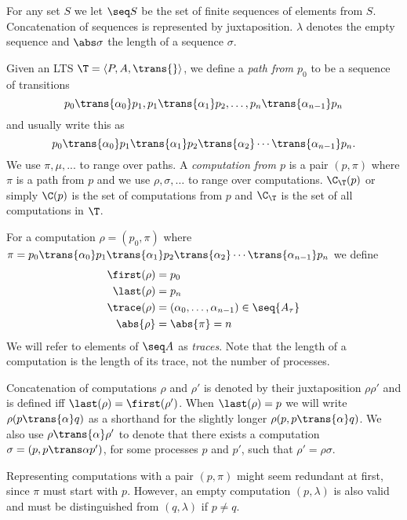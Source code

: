 \begin{definition}
    For any set $S$ we let $\seq S$ be the set of finite sequences of elements
    from $S$. Concatenation of sequences is represented by juxtaposition.
    $\lambda$ denotes the empty sequence and $\abs\sigma$ the length of a
    sequence $\sigma$.

    Given an LTS $\T = \langle P,A,\trans{} \rangle$, we define a
    \emph{path from $p_0$} to be a sequence of transitions
    \[
        p_0\trans{\alpha_0}p_1,
        p_1\trans{\alpha_1}p_2, \dots ,
        p_n\trans{\alpha_{n-1}}p_n
    \]
    and usually write this as
    \[
        p_0 \trans{\alpha_0} p_1
            \trans{\alpha_1} p_2
            \trans{\alpha_2} \cdots
            \trans{\alpha_{n-1}}p_n.
    \]
    We use $\pi,\mu,...$ to range over paths.
    A \emph{computation from $p$} is a pair $(p,\pi)$ where $\pi$ is a path
    from $p$ and
    we use $\rho,\sigma,\dots$ to
    range over computations.
    $\C_\T(p)$ or simply $\C(p)$ is the set of computations from $p$ and
    $\C_\T$ is the set of all computations in $\T$.

    For a computation $\rho = (p_0,\pi)$
    where $\pi = p_0 \trans{\alpha_0} p_1 \trans{\alpha_1} p_2 \trans{\alpha_2}
    \cdots \trans{\alpha_{n-1}}p_n$ we define
    \begin{align*}
        \first(\rho) &= p_0 \\
        \last(\rho) &= p_n \\
        \trace(\rho) &= (\alpha_0,\dots,\alpha_{n-1}) \in \seq{A_\tau} \\
        \abs{\rho} &= \abs{\pi} = n
    \end{align*}
    We will refer to  elements of $\seq A$
    as \emph{traces}. Note that the length
    of a computation is the length of its trace, not the number of processes.

    Concatenation of computations $\rho$ and $\rho'$
    is denoted by their juxtaposition
    $\rho\rho'$ and is defined iff $\last(\rho)=\first(\rho')$.
    When $\last(\rho) = p$ we will
    write $\rho(p\trans{\alpha} q)$ as a shorthand for the slightly longer
    $\rho(p, p\trans{\alpha} q)$.
    We also use $\rho \trans{\alpha} \rho'$ to denote that
    there exists a computation
    $\sigma = (p, p \trans\alpha p')$, for some processes $p$ and $p'$,
    such that $\rho' = \rho\sigma$.
\end{definition}

\begin{note}
    Representing computations with a pair $(p,\pi)$ might seem redundant at
    first, since $\pi$ must start with $p$. However, an empty computation
    $(p,\lambda)$ is also valid and must be distinguished from $(q,\lambda)$
    if $p\ne q$.
\end{note} 